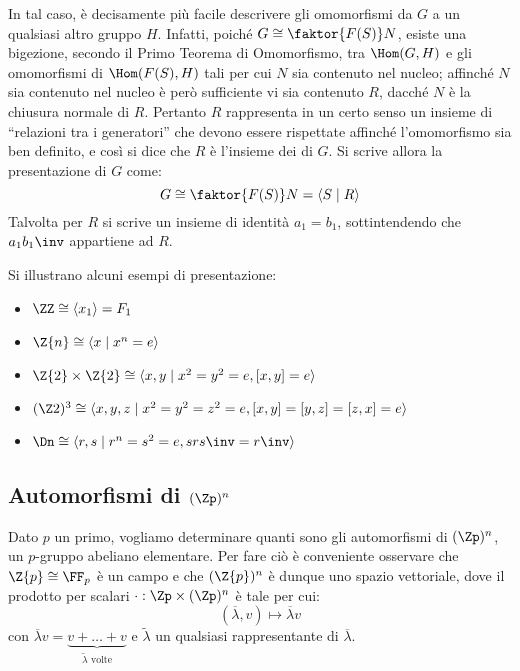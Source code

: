 \documentclass[11pt]{scrartcl}
\begin{document}
	
	In tal caso, è decisamente più facile descrivere gli
	omomorfismi da $G$ a un qualsiasi altro gruppo $H$.
	Infatti, poiché $G \cong \faktor{F(S)}N$, esiste una bigezione,
	secondo il Primo Teorema di Omomorfismo, tra
	$\Hom(G, H)$ e gli omomorfismi di $\Hom(F(S), H)$ tali
	per cui $N$ sia contenuto nel nucleo; affinché $N$
	sia contenuto nel nucleo è però sufficiente
	vi sia contenuto $R$, dacché $N$ è la chiusura normale
	di $R$. Pertanto $R$ rappresenta in un certo senso un
	insieme di ``relazioni tra i generatori'' che devono
	essere rispettate affinché l'omomorfismo sia ben definito, e
	così si dice che $R$ è l'insieme dei  di $G$.
	Si scrive allora la presentazione di $G$ come:
	\[ G \cong \faktor{F(S)}N = \langle S \mid R \rangle \]
	Talvolta per $R$ si scrive un insieme di identità
	$a_1 = b_1$, sottintendendo che
	$a_1 b_1\inv$ appartiene ad $R$.
	
	\begin{example}
		Si illustrano alcuni esempi di presentazione:
		
		\begin{itemize}
			\item $\ZZ \cong \langle x_1 \rangle = F_1$
			\item $\Z{n} \cong \langle{x \mid x^n = e}\rangle$
			\item $\Z{2} \times \Z{2} \cong \langle{x, y \mid x^2 = y^2 = e, [x, y] = e}\rangle$
			\item $(\Z2)^3 \cong \langle x, y, z \mid x^2 = y^2 = z^2 = e, [x, y] = [y, z] = [z, x] = e \rangle$
			\item $\Dn \cong \langle{r, s \mid r^n = s^2 = e, srs\inv = r\inv}\rangle$
		\end{itemize}
	\end{example}
	
	\newpage
	
	\subsection{Automorfismi di \texorpdfstring{$(\Zp)^n$}{(Z/pZ)ⁿ}}
	\label{sez1.2}
	
	Dato $p$ un primo, vogliamo determinare quanti sono gli automorfismi di 
	$(\Zp)^n$, un $p$-gruppo abeliano elementare. Per fare ciò è conveniente osservare che $\Z{p} \cong \FF_p$ è un campo e che
	$(\Z{p})^n$ è dunque uno spazio vettoriale, dove il prodotto per scalari $\cdot : \Zp\times (\Zp)^n$ è
	tale per cui:
	\[
	(\overline{\lambda}, v)\longmapsto \overline{\lambda}v
	\]
	con $\overline{\lambda}v = \underset{\tilde{\lambda}\text{ volte}}{\underbrace{v + \ldots + v}}$
	e $\tilde{\lambda}$ un qualsiasi rappresentante di $\overline{\lambda}$. \medskip
	
\end{document}
